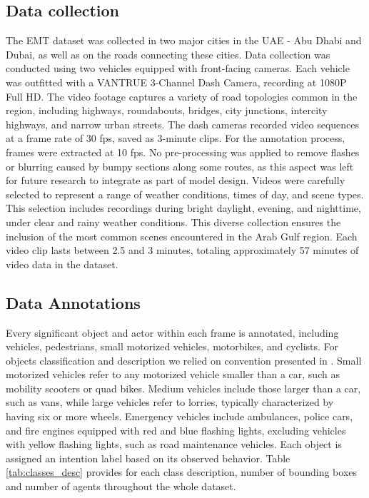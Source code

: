 \subsection{Data collection}
The EMT dataset was collected in two major cities in the UAE - Abu Dhabi and Dubai, as well as on the roads connecting these cities. Data collection was conducted using two vehicles equipped with front-facing cameras. Each vehicle was outfitted with a VANTRUE 3-Channel Dash Camera, recording at 1080P Full HD. The video footage captures a variety of road topologies common in the region, including highways, roundabouts, bridges, city junctions, intercity highways, and narrow urban streets. The dash cameras recorded video sequences at a frame rate of 30 fps, saved as 3-minute clips. For the annotation process, frames were extracted at 10 fps. No pre-processing was applied to remove flashes or blurring caused by bumpy sections along some routes, as this aspect was left for future research to integrate as part of model design. Videos were carefully selected to represent a range of weather conditions, times of day, and scene types. This selection includes recordings during bright daylight, evening, and nighttime, under clear and rainy weather conditions. This diverse collection ensures the inclusion of the most common scenes encountered in the Arab Gulf region. Each video clip lasts between 2.5 and 3 minutes, totaling approximately 57 minutes of video data in the dataset.


\subsection{Data Annotations}
Every significant object and actor within each frame is annotated, including vehicles, pedestrians, small motorized vehicles, motorbikes, and cyclists. For objects classification and description we relied on convention presented in \cite{9712346}. Small motorized vehicles refer to any motorized vehicle smaller than a car, such as mobility scooters or quad bikes. Medium vehicles include those larger than a car, such as vans, while large vehicles refer to lorries, typically characterized by having six or more wheels. Emergency vehicles include ambulances, police cars, and fire engines equipped with red and blue flashing lights, excluding vehicles with yellow flashing lights, such as road maintenance vehicles. Each object is assigned an intention label based on its observed behavior. Table \ref{tab:classes_desc} provides for each class description, number of bounding boxes and number of agents throughout the whole dataset.

